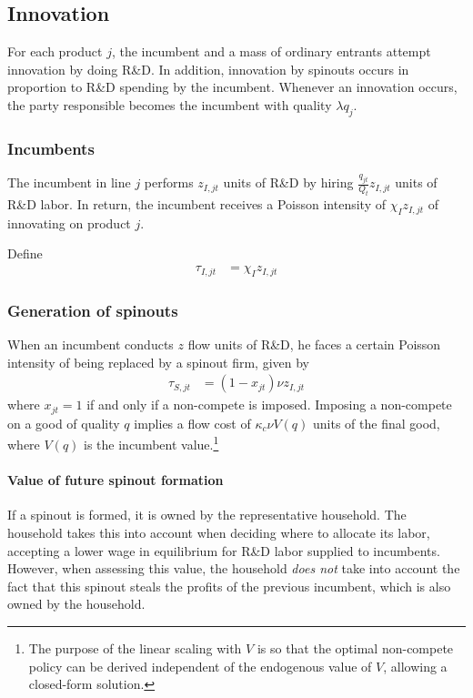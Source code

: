 \documentclass[12pt,english]{article}
\theoremstyle{remark}
\begin{document}
\subsection{Innovation}

For each product $j$, the incumbent and a mass of ordinary entrants attempt innovation by doing R\&D. In addition, innovation by spinouts occurs in proportion to R\&D spending by the incumbent. Whenever an innovation occurs, the party responsible becomes the incumbent with quality $\lambda q_j$. 

\subsubsection{Incumbents}

The incumbent in line $j$ performs $z_{I,jt}$ units of R\&D by hiring $\frac{q_{jt}}{Q_t}z_{I,jt}$ units of R\&D labor. In return, the incumbent receives a Poisson intensity of $\chi_I z_{I,jt}$ of innovating on product $j$. 

Define
\begin{align}
	\tau_{I,jt} &= \chi_I z_{I,jt}
\end{align}


\subsubsection{Generation of spinouts}

When an incumbent conducts $z$ flow units of R\&D, he faces a certain Poisson intensity of being replaced by a spinout firm, given by 
\begin{align*}
	\tau_{S,jt} &= (1-x_{jt}) \nu z_{I,jt}
\end{align*} 
where $x_{jt} = 1$ if and only if a non-compete is imposed. Imposing a non-compete on a good of quality $q$ implies a flow cost of $\kappa_{c} \nu V(q)$ units of the final good, where $V(q)$ is the incumbent value.\footnote{The purpose of the linear scaling with $V$ is so that the optimal non-compete policy can be derived independent of the endogenous value of $V$, allowing a closed-form solution.}

\paragraph{Value of future spinout formation}

If a spinout is formed, it is owned by the representative household. The household takes this into account when deciding where to allocate its labor, accepting a lower wage in equilibrium for R\&D labor supplied to incumbents. However, when assessing this value, the household \textit{does not} take into account the fact that this spinout steals the profits of the previous incumbent, which is also owned by the household. 
\end{document}
